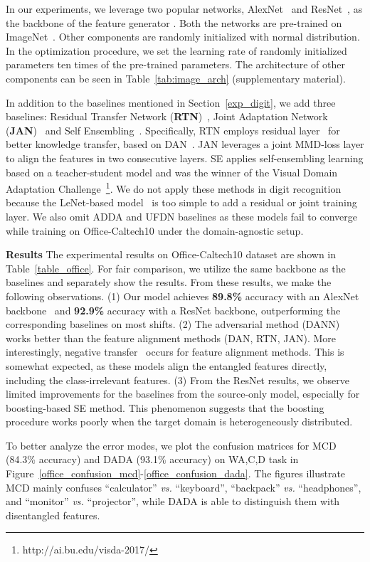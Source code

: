 \documentclass{article}
\begin{document}
In our experiments, we leverage two popular networks, AlexNet~\cite{alexnet} and ResNet~\cite{resnet}, as the backbone of the feature generator . Both the networks are pre-trained on  ImageNet~\cite{ImageNet}. Other components are randomly initialized with normal distribution. In the optimization procedure, we set the learning rate of randomly initialized parameters ten times of the pre-trained parameters. 
The architecture of other components can be seen in Table~\ref{tab:image_arch} (supplementary material). 

In addition to the baselines mentioned in Section~\ref{exp_digit}, we add three baselines: Residual Transfer Network (\textbf{RTN})~\cite{RTN}, Joint Adaptation Network (\textbf{JAN})~\cite{JAN} and Self Ensembling~\cite{SE}. Specifically, RTN employs residual layer~\cite{resnet} for better knowledge transfer, based on DAN~\cite{long2015}. JAN leverages a joint MMD-loss layer to align the features in two consecutive layers. SE applies self-ensembling learning based on a teacher-student model and was the winner of the Visual Domain Adaptation Challenge~\footnote{http://ai.bu.edu/visda-2017/}. We do not apply these methods in digit recognition because the LeNet-based model~\cite{lecun89} is too simple to add a residual or joint training layer. We also omit ADDA and UFDN baselines as these models fail to converge while training on Office-Caltech10 under the domain-agnostic setup. 

\textbf{Results} The experimental results on Office-Caltech10 dataset are shown in Table~\ref{table_office}. For fair comparison, we utilize the same backbone as the baselines and separately show the results. From these results, we make the following observations. (1) Our model achieves \textbf{89.8\%} accuracy with an AlexNet backbone~\cite{alexnet} and \textbf{92.9\%} accuracy with a ResNet backbone, outperforming the corresponding baselines on most shifts. 
(2) The adversarial method (DANN) works better than the feature alignment methods (DAN, RTN, JAN). More interestingly, negative transfer~\cite{pan2010survey} occurs for feature alignment methods. This is somewhat expected, as these models align the entangled features directly, including the class-irrelevant features. (3) From the ResNet results, we observe limited improvements for the baselines from the source-only model, especially for boosting-based SE method. This phenomenon suggests that the boosting procedure works poorly when the target domain is heterogeneously distributed. 

To better analyze the error modes, we plot the confusion matrices for MCD (84.3\% accuracy) and DADA (93.1\% accuracy)  on WA,C,D task in Figure~\ref{office_confusion_mcd}-\ref{office_confusion_dada}. The figures illustrate MCD mainly confuses  ``calculator'' \textit{vs.} ``keyboard'',  ``backpack'' \textit{vs.} ``headphones'', and ``monitor'' \textit{vs.} ``projector'', while DADA is able to distinguish them with disentangled features.
\end{document}
